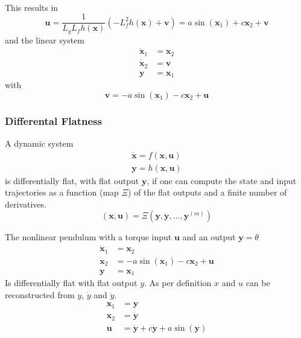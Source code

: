 \begin{examplesection}[Pendulum]
\begin{align*}
    \end{align*}
    This results in
    \begin{equation*}
        \mathbf{u} = \frac{1}{L_g L_f h(\mathbf{x})}(-L_f^2 h(\mathbf{x}) + \mathbf{v}) = a \sin(\mathbf{x}_1) + c \mathbf{x}_2 + \mathbf{v}
    \end{equation*}
    and the linear system
    \begin{align*}
        \dot{\mathbf{x}}_1 & = \mathbf{x}_2 \\
        \dot{\mathbf{x}}_2 & = \mathbf{v}   \\
        \mathbf{y}         & = \mathbf{x}_1
    \end{align*}
    with
    \begin{equation*}
        \mathbf{v} = -a \sin(\mathbf{x}_1)-c \mathbf{x}_2 + \mathbf{u}
    \end{equation*}
\end{examplesection}

\subsubsection{Differental Flatness}\label{diff_flatness}
A dynamic system
\begin{gather*}
    \dot{\mathbf{x}} = f(\mathbf{x},\mathbf{u}) \\
    \mathbf{y} = h(\mathbf{x},\mathbf{u})
\end{gather*}
is differentially flat, with flat output $\mathbf{y}$, if one can compute the state and input trajectories as a function (map $\Xi$) of the flat outputs and a finite number of derivatives.
\begin{equation*}
    (\mathbf{x},\mathbf{u}) = \Xi (\mathbf{y},\dot{\mathbf{y}}, \ldots, \mathbf{y}^{(m)})
\end{equation*}

\begin{examplesection}[Pendulum]
    The nonlinear pendulum with a torque input $\mathbf{u}$ and an output $\mathbf{y}=\theta$
    \begin{align*}
        \dot{\mathbf{x}}_1 & = \mathbf{x}_2                    \\
        \dot{\mathbf{x}}_2 & = -a \sin(\mathbf{x}_1)-c \mathbf{x}_2 + \mathbf{u} \\
        \mathbf{y}         & = \mathbf{x}_1
    \end{align*}
    Is differentially flat with flat output $y$. As per definition $x$ and $u$ can be reconstructed from $y$, $\dot{y}$ and $\ddot{y}$.
    \begin{align*}
        \mathbf{x}_1 & = \mathbf{y}                                \\
        \mathbf{x}_2 & = \dot{\mathbf{y}}                          \\
        \mathbf{u}   & = \ddot{\mathbf{y}} + c \dot{\mathbf{y}} + a \sin(\mathbf{y})
    \end{align*}
\end{examplesection}

